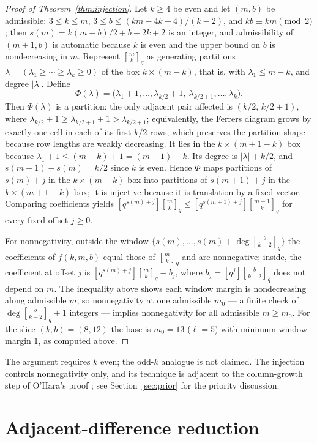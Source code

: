 \documentclass[11pt]{article}
\theoremstyle{definition}
\newcommand{\gauss}[2]{\genfrac{[}{]}{0pt}{0}{#1}{#2}_q}
\newcommand{\coeff}[1]{[q^{#1}]}
\begin{document}
\begin{proof}[Proof of Theorem~\ref{thm:injection}]
Let $k\ge4$ be even and let $(m,b)$ be admissible: $3\le k\le m$, $3\le b\le(km-4k+4)/(k-2)$, and
$kb\equiv km\pmod2$; then $s(m)=k(m-b)/2+b-2k+2$ is an integer, and admissibility of $(m+1,b)$ is
automatic because $k$ is even and the upper bound on $b$ is nondecreasing in $m$. Represent
$\gauss{m}{k}$ as generating partitions $\lambda=(\lambda_1\ge\cdots\ge\lambda_k\ge0)$ of the box
$k\times(m-k)$, that is, with $\lambda_1\le m-k$, and degree $|\lambda|$. Define
\[
  \Phi(\lambda)=\bigl(\lambda_1+1,\dots,\lambda_{k/2}+1,\ \lambda_{k/2+1},\dots,\lambda_k\bigr).
\]
Then $\Phi(\lambda)$ is a partition: the only adjacent pair affected is $(k/2,\,k/2+1)$, where
$\lambda_{k/2}+1\ge\lambda_{k/2+1}+1>\lambda_{k/2+1}$; equivalently, the Ferrers diagram grows by
exactly one cell in each of its first $k/2$ rows, which preserves the partition shape because row
lengths are weakly decreasing. It lies in the $k\times(m+1-k)$ box because
$\lambda_1+1\le(m-k)+1=(m+1)-k$. Its degree is $|\lambda|+k/2$, and $s(m+1)-s(m)=k/2$ since $k$ is
even. Hence $\Phi$ maps partitions of $s(m)+j$ in the $k\times(m-k)$ box into partitions of
$s(m+1)+j$ in the $k\times(m+1-k)$ box; it is injective because it is translation by a fixed
vector. Comparing coefficients yields $\coeff{s(m)+j}\gauss{m}{k}\le
\coeff{s(m+1)+j}\gauss{m+1}{k}$ for every fixed offset $j\ge0$.

For nonnegativity, outside the window $\{s(m),\dots,s(m)+\deg\gauss{b}{k-2}\}$ the coefficients of
$f(k,m,b)$ equal those of $\gauss{m}{k}$ and are nonnegative; inside, the coefficient at offset $j$
is $\coeff{s(m)+j}\gauss{m}{k}-b_j$, where $b_j=\coeff{j}\gauss{b}{k-2}$ does not depend on $m$. The
inequality above shows each window margin is nondecreasing along admissible $m$, so nonnegativity at
one admissible $m_0$ --- a finite check of $\deg\gauss{b}{k-2}+1$ integers --- implies
nonnegativity for all admissible $m\ge m_0$. For the slice $(k,b)=(8,12)$ the base is $m_0=13$
($\ell=5$) with minimum window margin $1$, as computed above.
\end{proof}

The argument requires $k$ even; the odd-$k$ analogue is not claimed. The injection controls
nonnegativity only, and its technique is adjacent to the column-growth step of O'Hara's proof
\cite{ohara}; see Section~\ref{sec:prior} for the priority discussion.

\section{Adjacent-difference reduction}\label{sec:reduction}
\end{document}
